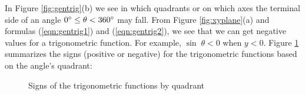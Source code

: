 In Figure \ref{fig:gentrig}(b) we see in which quadrants or on which axes the terminal
side of an angle $0^\circ \le \theta < 360^\circ$ may fall. From
Figure \ref{fig:xyplane}(a) and formulas (\ref{eqn:gentrig1}) and (\ref{eqn:gentrig2}), we see that
we can get negative values for a trigonometric function. For example, $\sin\;\theta < 0$ when $y<0$.
Figure \ref{fig:signchart} summarizes the signs (positive or negative) for the trigonometric
functions based on the angle's quadrant:

\begin{figure}[h]
 \begin{center}
  \vspace{-3mm}
 \end{center}
 \caption[]{\quad Signs of the trigonometric functions by quadrant}
 \label{fig:signchart}
\end{figure}
